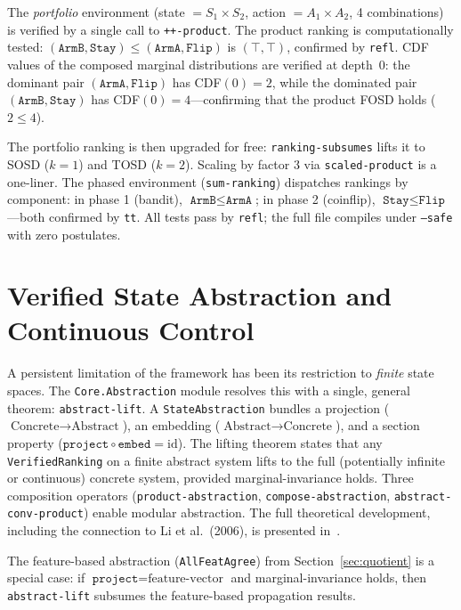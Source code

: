 \documentclass[9pt,a4paper]{article}
\theoremstyle{plain}
\theoremstyle{definition}
\theoremstyle{remark}
\begin{document}
The \emph{portfolio} environment (state $= S_1 \times S_2$, action $= A_1 \times A_2$, 4 combinations) is verified by a single call to \texttt{++-product}.  The product ranking is computationally tested: $(\texttt{ArmB}, \texttt{Stay}) \le (\texttt{ArmA}, \texttt{Flip})$ is $(\top, \top)$, confirmed by \texttt{refl}.  CDF values of the composed marginal distributions are verified at depth~0: the dominant pair $(\texttt{ArmA}, \texttt{Flip})$ has CDF$(0) = 2$, while the dominated pair $(\texttt{ArmB}, \texttt{Stay})$ has CDF$(0) = 4$---confirming that the product FOSD holds ($2 \le 4$).

The portfolio ranking is then upgraded for free: \texttt{ranking-subsumes} lifts it to SOSD ($k{=}1$) and TOSD ($k{=}2$).  Scaling by factor 3 via \texttt{scaled-product} is a one-liner.  The phased environment (\texttt{sum-ranking}) dispatches rankings by component: in phase 1 (bandit), $\texttt{ArmB} \le \texttt{ArmA}$; in phase 2 (coinflip), $\texttt{Stay} \le \texttt{Flip}$---both confirmed by \texttt{tt}.  All tests pass by \texttt{refl}; the full file compiles under \texttt{--safe} with zero postulates.

\section{Verified State Abstraction and Continuous Control}
\label{sec:abstraction}

A persistent limitation of the framework has been its restriction to \emph{finite} state spaces.  The \texttt{Core.Abstraction} module resolves this with a single, general theorem: \texttt{abstract-lift}.  A \texttt{StateAbstraction} bundles a projection ($\text{Concrete} \to \text{Abstract}$), an embedding ($\text{Abstract} \to \text{Concrete}$), and a section property ($\texttt{project} \circ \texttt{embed} = \text{id}$).  The lifting theorem states that any \texttt{VerifiedRanking} on a finite abstract system lifts to the full (potentially infinite or continuous) concrete system, provided marginal-invariance holds.  Three composition operators (\texttt{product-abstraction}, \texttt{compose-abstraction}, \texttt{abstract-conv-product}) enable modular abstraction.  The full theoretical development, including the connection to Li et al.~(2006), is presented in~\cite{CSHRLSuccessor}.

The feature-based abstraction (\texttt{AllFeatAgree}) from Section~\ref{sec:quotient} is a special case: if $\texttt{project} = \text{feature-vector}$ and marginal-invariance holds, then \texttt{abstract-lift} subsumes the feature-based propagation results.
\end{document}
